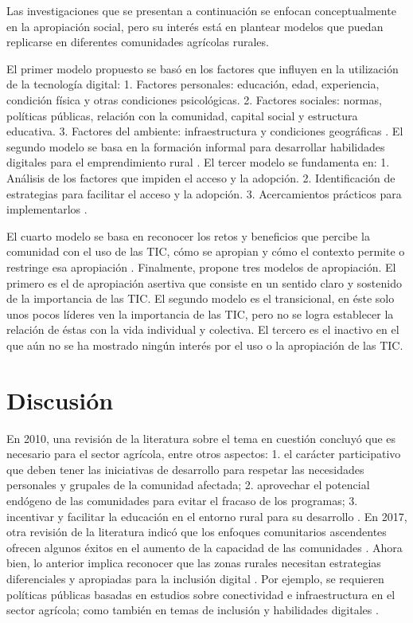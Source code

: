 \documentclass[spanish]{textolivre}
\begin{document}
Las investigaciones que se presentan a continuación se enfocan conceptualmente en la apropiación social, pero su interés está en plantear modelos que puedan replicarse en diferentes comunidades agrícolas rurales. 

El primer modelo propuesto se basó en los factores que influyen en la utilización de la tecnología digital: 1. Factores personales: educación, edad, experiencia, condición física y otras condiciones psicológicas. 2. Factores sociales: normas, políticas públicas, relación con la comunidad, capital social y estructura educativa. 3. Factores del ambiente: infraestructura y condiciones geográficas \cite{savira_digitalizing_2020}. El segundo modelo se basa en la formación informal para desarrollar habilidades digitales para el emprendimiento rural \cite{ali_framework_2019}. El tercer modelo se fundamenta en: 1. Análisis de los factores que impiden el acceso y la adopción. 2. Identificación de estrategias para facilitar el acceso y la adopción. 3. Acercamientos prácticos para implementarlos \cite{matsenjwa_pro-poor_2019}.

El cuarto modelo se basa en reconocer los retos y beneficios que percibe la comunidad con el uso de las TIC, cómo se apropian y cómo el contexto permite o restringe esa apropiación \cite{hatakka_understanding_2020}. Finalmente, \textcite{acosta_nates_culturas_2014} propone tres modelos de apropiación. El primero es el de apropiación asertiva que consiste en un sentido claro y sostenido de la importancia de las TIC. El segundo modelo es el transicional, en éste solo unos pocos líderes ven la importancia de las TIC, pero no se logra establecer la relación de éstas con la vida individual y colectiva. El tercero es el inactivo en el que aún no se ha mostrado ningún interés por el uso o la apropiación de las TIC. 

\section{Discusión}

En 2010, una revisión de la literatura sobre el tema en cuestión concluyó que es necesario para el sector agrícola, entre otros aspectos: 1. el carácter participativo que deben tener las iniciativas de desarrollo para respetar las necesidades personales y grupales de la comunidad afectada; 2. aprovechar el potencial endógeno de las comunidades para evitar el fracaso de los programas; 3. incentivar y facilitar la educación en el entorno rural para su desarrollo \cite{felizzola_cruz_tecnologias_2010}. En 2017, otra revisión de la literatura indicó que los enfoques comunitarios ascendentes ofrecen algunos éxitos en el aumento de la capacidad de las comunidades \cite{roberts_review_2017}. Ahora bien, lo anterior implica reconocer que las zonas rurales necesitan estrategias diferenciales y apropiadas para la inclusión digital \cite{roberts_review_2017}. Por ejemplo, se requieren políticas públicas basadas en estudios sobre conectividad e infraestructura en el sector agrícola; como también en temas de inclusión y habilidades digitales \cite{salemink_rural_2017}.
\end{document}
